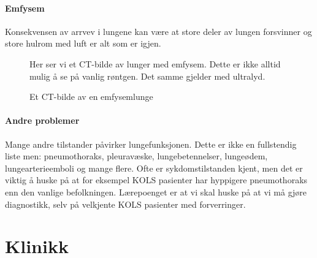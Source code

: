 			\paragraph{Emfysem\\}
				Konsekvensen av arrvev i lungene kan være at store deler av lungen forsvinner og store hulrom med luft er alt som er igjen. 
					\begin{figure}[ht]
                      \centering
                      \caption{Et CT-bilde av en emfysemlunge}
                      {Her ser vi et CT-bilde av lunger med emfysem. Dette er ikke alltid mulig å se på vanlig røntgen. Det samme gjelder med ultralyd.}%
                    \end{figure}
            \paragraph{Andre problemer\\}
            	Mange andre tilstander påvirker lungefunksjonen. Dette er ikke en fullstendig liste men: pneumothoraks, pleuravæske, lungebetennelser, lungeødem, lungearterieemboli og mange flere. Ofte er sykdomstilstanden kjent, men det er viktig å huske på at for eksempel KOLS pasienter har hyppigere pneumothoraks enn den vanlige befolkningen. Lærepoenget er at vi skal huske på at vi må gjøre diagnostikk, selv på velkjente KOLS pasienter med forverringer. 
		\section{Klinikk}

